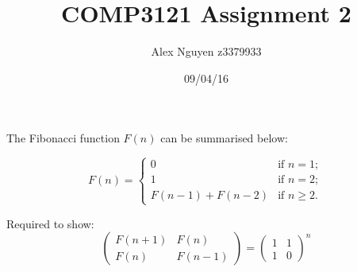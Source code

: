 \documentclass[11pt, a4paper]{article}
\title{COMP3121 Assignment 2}
\author{Alex Nguyen z3379933}
\date{09/04/16}
\begin{document}
The Fibonacci function $F(n)$ can be summarised below:


\[ F(n) = \left\{ \begin{array}{ll}
         0 & \mbox{if $n = 1$};\\
         1 & \mbox{if $n =  2$};\\
        F(n-1) + F(n-2) & \mbox{if $n \ge 2$}.\end{array} \right. \] 

Required to show:
      \begin{equation}
        \begin{pmatrix}
          F(n+1) & F(n) \\
          F(n) & F(n-1)
        \end{pmatrix} 
        =
        \begin{pmatrix}
          1 & 1 \\
          1 & 0
        \end{pmatrix} ^n
      \end{equation}
\end{document}
